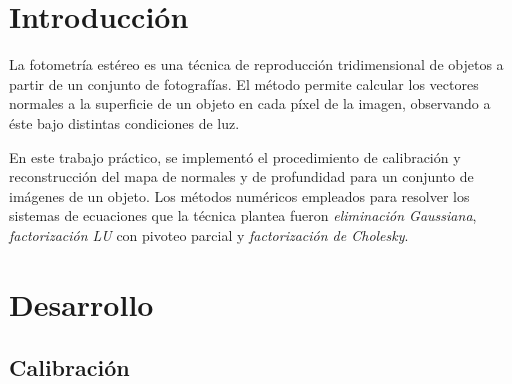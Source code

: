 \documentclass{article}
\begin{document}
\maketitle
\tableofcontents
\clearpage

\section{Introducción}


La fotometría estéreo es una técnica de reproducción tridimensional de objetos a partir de un conjunto de fotografías. El método permite calcular los vectores normales a la superficie de un objeto en cada píxel de la imagen, observando a éste bajo distintas condiciones de luz\cite{Woodham80}.

En este trabajo práctico, se implementó el procedimiento de calibración y reconstrucción del mapa de normales y de profundidad para un conjunto de imágenes de un objeto.  Los métodos numéricos empleados para resolver los sistemas de ecuaciones que la técnica plantea fueron \textit{eliminación Gaussiana}, \textit{factorización LU} con pivoteo parcial y \textit{factorización de Cholesky}.


\section{Desarrollo}


\subsection{Calibración}
\end{document}
